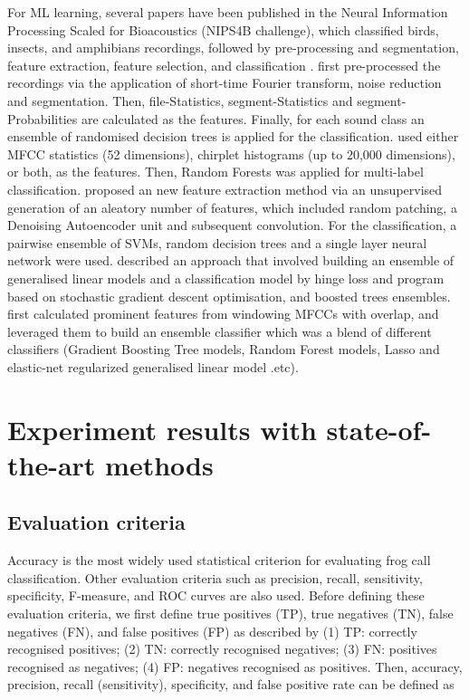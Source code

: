 For ML learning, several papers have been published in the Neural Information Processing Scaled for Bioacoustics (NIPS4B challenge), which classified birds, insects, and amphibians recordings, followed by pre-processing and segmentation, feature extraction, feature selection, and classification \citep{lasseck2013bird, stowell2013feature, mencia2013learning, massaronensemble, chen2013novel}. \citep{lasseck2013bird} first pre-processed the recordings via the application of short-time Fourier transform, noise reduction and segmentation. Then, file-Statistics, segment-Statistics and segment-Probabilities are calculated as the features. Finally, for each sound class an ensemble of
randomised decision trees is applied for the classification. \citep{stowell2013feature} used either MFCC statistics (52 dimensions), chirplet histograms (up
to 20,000 dimensions), or both, as the features. Then, Random Forests was applied for multi-label classification. \citep{mencia2013learning} proposed an new feature extraction method via an unsupervised generation of an aleatory number of features, which included random patching, a Denoising Autoencoder unit and subsequent convolution. For the classification, a pairwise ensemble of SVMs, random decision trees and a single layer
neural network were used. 
\citep{massaronensemble} described an approach that involved building an ensemble of generalised linear models and a classification model by hinge loss and program based on stochastic gradient descent optimisation, and boosted trees ensembles. 
\citep{chen2013novel} first calculated prominent features from windowing MFCCs with overlap, and leveraged them to build an ensemble classifier which was a blend of different classifiers (Gradient Boosting Tree models, Random Forest models, Lasso and elastic-net regularized generalised linear model .etc).




\section{Experiment results with state-of-the-art methods}
\label{ch2:experiment}


\subsection{Evaluation criteria}

Accuracy is the most widely used statistical criterion for evaluating frog call classification. Other evaluation criteria such as precision, recall, sensitivity, specificity, F-measure, and ROC curves are also used. Before defining these evaluation criteria, we first define true positives (TP), true negatives (TN), false negatives (FN), and false positives (FP) as described by  \citep{gordon2003sequence} 
(1) TP: correctly recognised positives;
(2) TN: correctly recognised negatives;
(3) FN: positives recognised as negatives;
(4) FP: negatives recognised as positives.
Then, accuracy, precision, recall (sensitivity), specificity, and false positive rate can be defined as

